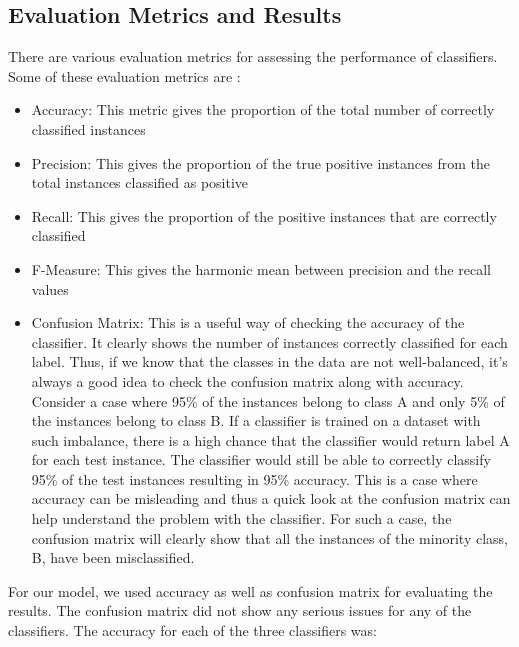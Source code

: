 \documentclass[sigconf]{acmart}
\begin{document}
\subsection{Evaluation Metrics and Results}
There are various evaluation metrics for assessing the performance of classifiers. Some of these evaluation metrics are \cite{hossin2015review}:
\begin{itemize}
    \item Accuracy: This metric gives the proportion of the total number of correctly classified instances
    \item Precision: This gives the proportion of the true positive instances from the total instances classified as positive
    \item Recall: This gives the proportion of the positive instances that are correctly classified
    \item F-Measure: This gives the harmonic mean between precision and the recall values
    \item Confusion Matrix: This is a useful way of checking the accuracy of the classifier. It clearly shows the number of instances correctly classified for each label. Thus, if we know that the classes in the data are not well-balanced, it's always a good idea to check the confusion matrix along with accuracy. Consider a case where 95\% of the instances belong to class A and only 5\% of the instances belong to class B. If a classifier is trained on a dataset with such imbalance, there is a high chance that the classifier would return label A for each test instance. The classifier would still be able to correctly classify 95\% of the test instances resulting in 95\% accuracy. This is a case where accuracy can be misleading and thus a quick look at the confusion matrix can help understand the problem with the classifier. For such a case, the confusion matrix will clearly show that all the instances of the minority class, B, have been misclassified.
\end{itemize}

For our model, we used accuracy as well as confusion matrix for evaluating the results. The confusion matrix did not show any serious issues for any of the classifiers. The accuracy for each of the three classifiers was:
\end{document}
